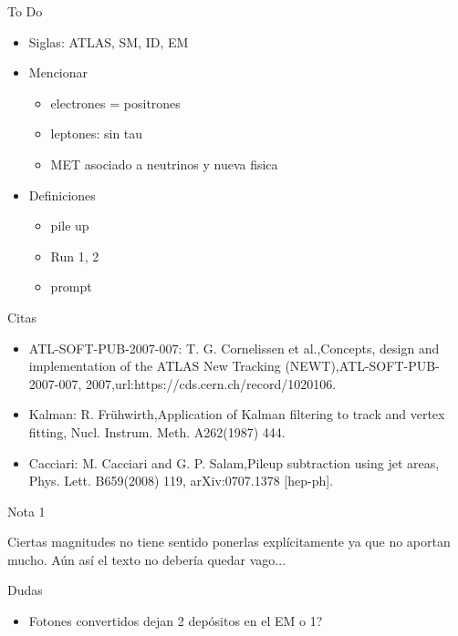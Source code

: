 
{\LARGE To Do}

\begin{itemize}
	\item Siglas: ATLAS, SM, ID, EM
	\item Mencionar
	\begin{itemize}
		\item electrones = positrones
		\item leptones: sin tau
		\item MET asociado a neutrinos y nueva fisica
	\end{itemize}
	\item Definiciones
	\begin{itemize}
		\item pile up
		\item Run 1, 2
		\item prompt
	\end{itemize}
\end{itemize}


\vspace{2cm}


{\LARGE Citas}

\begin{itemize}
	\item ATL-SOFT-PUB-2007-007: T. G. Cornelissen et al.,Concepts, design and implementation of the ATLAS New Tracking (NEWT),ATL-SOFT-PUB-2007-007, 2007,url:https://cds.cern.ch/record/1020106.
	\item Kalman: R. Frühwirth,Application of Kalman filtering to track and vertex fitting, Nucl. Instrum. Meth. A262(1987) 444.
	\item Cacciari: M. Cacciari and G. P. Salam,Pileup subtraction using jet areas, Phys. Lett. B659(2008) 119, arXiv:0707.1378 [hep-ph].
\end{itemize}


\vspace{2cm}


{\LARGE Nota 1}

Ciertas magnitudes no tiene sentido ponerlas explícitamente ya que no aportan mucho. Aún así el texto no debería quedar vago...


\vspace{2cm}


{\LARGE Dudas}

\begin{itemize}
	\item Fotones convertidos dejan 2 depósitos en el EM o 1?
\end{itemize}